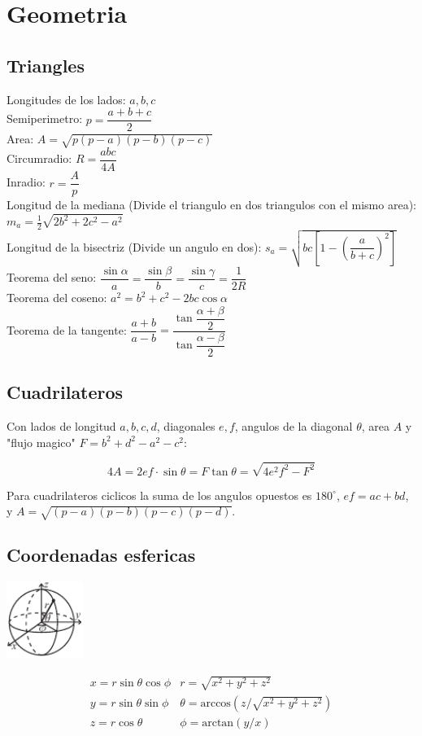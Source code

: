 \section{Geometria}

\subsection{Triangles}
Longitudes de los lados: $a,b,c$\\
Semiperimetro: $p=\dfrac{a+b+c}{2}$\\
Area: $A=\sqrt{p(p-a)(p-b)(p-c)}$\\
Circumradio: $R=\dfrac{abc}{4A}$\\
Inradio: $r=\dfrac{A}{p}$\\
Longitud de la mediana (Divide el triangulo en dos triangulos con el mismo area): $m_a=\tfrac{1}{2}\sqrt{2b^2+2c^2-a^2}$\\
Longitud de la bisectriz (Divide un angulo en dos): $s_a=\sqrt{bc\left[1-\left(\dfrac{a}{b+c}\right)^2\right]}$\\
Teorema del seno: $\dfrac{\sin\alpha}{a}=\dfrac{\sin\beta}{b}=\dfrac{\sin\gamma}{c}=\dfrac{1}{2R}$\\
Teorema del coseno: $a^2=b^2+c^2-2bc\cos\alpha$\\
Teorema de la tangente: $\dfrac{a+b}{a-b}=\dfrac{\tan\dfrac{\alpha+\beta}{2}}{\tan\dfrac{\alpha-\beta}{2}}$\\

\subsection{Cuadrilateros}
Con lados de longitud $a,b,c,d$, diagonales $e, f$, angulos de la diagonal $\theta$, area $A$ y "flujo magico" $F=b^2+d^2-a^2-c^2$:

\[ 4A = 2ef \cdot \sin\theta = F\tan\theta = \sqrt{4e^2f^2-F^2} \]

Para cuadrilateros ciclicos la suma de los angulos opuestos es $180^\circ$,
$ef = ac + bd$, y $A = \sqrt{(p-a)(p-b)(p-c)(p-d)}$.

\subsection{Coordenadas esfericas}
\begin{center}
\includegraphics[width=25mm]{content/math/sphericalCoordinates}
\end{center}
\[\begin{array}{cc}
x = r\sin\theta\cos\phi & r = \sqrt{x^2+y^2+z^2}\\
y = r\sin\theta\sin\phi & \theta = \textrm{arccos}(z/\sqrt{x^2+y^2+z^2})\\
z = r\cos\theta & \phi = \textrm{arctan}(y/x)
\end{array}\]

